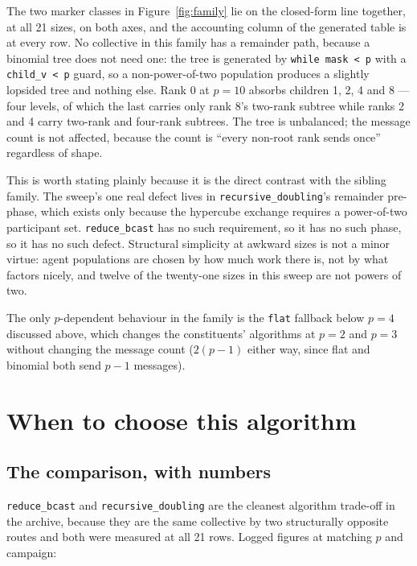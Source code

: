 \documentclass[11pt]{article}
\begin{document}
The two marker classes in Figure~\ref{fig:family} lie on the closed-form line together, at all 21
sizes, on both axes, and the accounting column of the generated table is \modelok{} at every row.
No collective in this family has a remainder path, because a binomial tree does not need one: the
tree is generated by \texttt{while mask < p} with a \texttt{child\_v < p} guard, so a
non-power-of-two population produces a slightly lopsided tree and nothing else. Rank 0 at $p=10$
absorbs children 1, 2, 4 and 8 --- four levels, of which the last carries only rank 8's
two-rank subtree while ranks 2 and 4 carry two-rank and four-rank subtrees. The tree is
unbalanced; the message count is not affected, because the count is ``every non-root rank sends
once'' regardless of shape.

This is worth stating plainly because it is the direct contrast with the sibling family. The
sweep's one real defect lives in \texttt{recursive\_doubling}'s remainder pre-phase, which exists
only because the hypercube exchange requires a power-of-two participant set. \texttt{reduce\_bcast}
has no such requirement, so it has no such phase, so it has no such defect. Structural
simplicity at awkward sizes is not a minor virtue: agent populations are chosen by how much work
there is, not by what factors nicely, and twelve of the twenty-one sizes in this sweep are not
powers of two.

The only $p$-dependent behaviour in the family is the \texttt{flat} fallback below $p=4$
discussed above, which changes the constituents' algorithms at $p=2$ and $p=3$ without changing
the message count ($2(p-1)$ either way, since flat and binomial both send $p-1$ messages).

\section{When to choose this algorithm}

\subsection{The comparison, with numbers}

\texttt{reduce\_bcast} and \texttt{recursive\_doubling} are the cleanest algorithm trade-off in
the archive, because they are the same collective by two structurally opposite routes and both
were measured at all 21 rows. Logged figures at matching $p$ and campaign:
\end{document}
